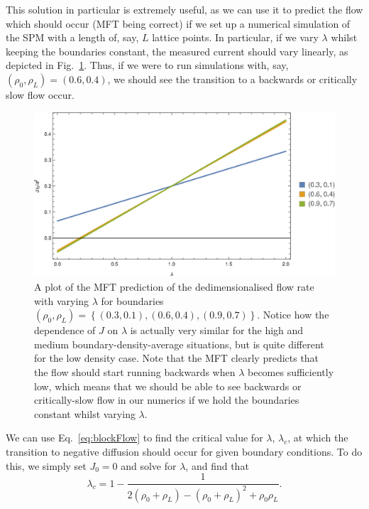 This solution in particular is extremely useful, as we can use it to predict the flow which should occur (MFT being correct) if we set up a numerical simulation of the SPM with a length of, say, $L$ lattice points. In particular,
if we vary $\lambda$ whilst keeping the boundaries constant, the measured current should vary linearly, as depicted in Fig.~\ref{fig:lambdaScanPlots}. Thus, if we were to run simulations with, say,
$(\rho_0, \rho_L) = (0.6, 0.4)$, we should see the transition to a backwards or critically slow flow occur.
\begin{figure}[h!]
 \caption[The variation of flow rate with respect to $\lambda$ in the MFT, with fixed boundary densities.]{\label{fig:lambdaScanPlots} A plot of the MFT prediction of the dedimensionalised flow rate with varying $\lambda$ for boundaries $(\rho_0, \rho_L) = \left\lbrace (0.3, 0.1), (0.6, 0.4), (0.9, 0.7) \right\rbrace$.
 Notice how the dependence of $J$ on $\lambda$ is actually very similar for the high and medium boundary-density-average situations, but is quite different for the low density case. Note that the MFT clearly predicts
 that the flow should start running backwards when $\lambda$ becomes sufficiently low, which means that we should be able to see backwards or critically-slow flow in our numerics if we hold the boundaries constant
 whilst varying $\lambda$.}
 \includegraphics[width=0.99\linewidth]{analytics/images/lambdaFlucPlots}
\end{figure}
We can use Eq.~\eqref{eq:blockFlow} to find the critical value for $\lambda$, $\lambda_c$, at which the transition to negative diffusion should occur for given boundary conditions.
To do this, we simply set $J_0 = 0$ and solve for $\lambda$, and find that 
\begin{equation}
\label{eq:critLambda}
 \lambda_c = 1 - \frac{1}{2(\rho_0 + \rho_L) - (\rho_0 + \rho_L)^2 + \rho_0 \rho_L} .
\end{equation}
